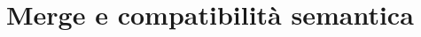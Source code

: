 \documentclass[aspectratio=169,11pt]{beamer}
\begin{document}




\section{Merge e compatibilit\`a semantica}
\end{document}
